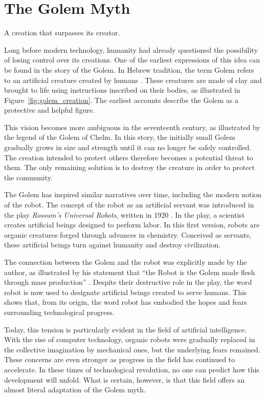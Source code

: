 \section{The Golem Myth}
\label{sec:introduction_the_golem_myth}

A creation that surpasses its creator.

Long before modern technology, humanity had already questioned the possibility of losing control over its creations.
One of the earliest expressions of this idea can be found in the story of the Golem.
In Hebrew tradition, the term Golem refers to an artificial creature created by humans \parencite{nocks1998golem}.
These creatures are made of clay and brought to life using instructions inscribed on their bodies, as illustrated in Figure~\ref{fig:golem_creation}.
The earliest accounts describe the Golem as a protective and helpful figure.



This vision becomes more ambiguous in the seventeenth century, as illustrated by the legend of the Golem of Chelm.
In this story, the initially small Golem gradually grows in size and strength until it can no longer be safely controlled.
The creation intended to protect others therefore becomes a potential threat to them.
The only remaining solution is to destroy the creature in order to protect the community.

The Golem has inspired similar narratives over time, including the modern notion of the robot.
The concept of the robot as an artificial servant was introduced in the play \textit{Rossum's Universal Robots}, written in 1920 \parencite{capek1920rur}.
In the play, a scientist creates artificial beings designed to perform labor.
In this first version, robots are organic creatures forged through advances in chemistry.
Conceived as servants, these artificial beings turn against humanity and destroy civilization.

The connection between the Golem and the robot was explicitly made by the author, as illustrated by his statement that \enquote{the Robot is the Golem made flesh through mass production} \parencite{comrada1995golem}.
Despite their destructive role in the play, the word robot is now used to designate artificial beings created to serve humans.
This shows that, from its origin, the word robot has embodied the hopes and fears surrounding technological progress.

Today, this tension is particularly evident in the field of artificial intelligence.
With the rise of computer technology, organic robots were gradually replaced in the collective imagination by mechanical ones, but the underlying fears remained.
These concerns are even stronger as progress in the field has continued to accelerate.
In these times of technological revolution, no one can predict how this development will unfold.
What is certain, however, is that this field offers an almost literal adaptation of the Golem myth.

